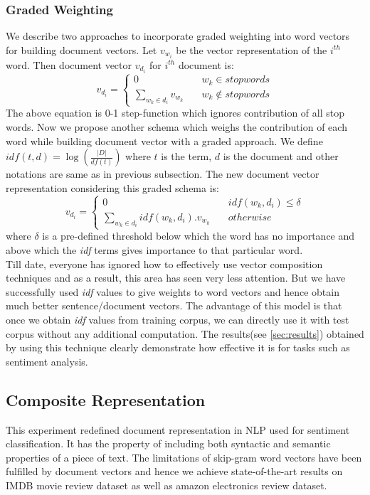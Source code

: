 \documentclass[11pt,a4paper]{article}
\begin{document}
\subsubsection{Graded Weighting}
\label{sec:graded_weighting}
We describe two approaches to incorporate graded weighting into word vectors for building document vectors. Let $v_{w_i}$ be the vector representation of the $i^{th}$ word. Then document vector $v_{d_i}$ for $i^{th}$ document is:
$$
v_{d_i} = \left\{
        \begin{array}{ll}
            0 & \quad w_k \in stopwords \\
            \sum\limits_{w_k \in d_i} v_{w_k} & \quad w_k \notin stopwords
        \end{array}
    \right.
$$
The above equation is 0-1 step-function which ignores contribution of all stop words. Now we propose another schema which weighs the contribution of each word while building document vector with a graded approach. We define $idf(t,d)=\log(\frac{|D|}{df(t)})$ where $t$ is the term, $d$ is the document and other notations are same as in previous subsection. The new document vector representation considering this graded schema is:
$$
v_{d_i} = \left\{
        \begin{array}{ll}
            0 & \quad idf(w_k,d_i) \leq \delta \\
            \sum\limits_{w_k \in d_i} idf(w_k,d_i).v_{w_k} & \quad otherwise
        \end{array}
    \right.
$$
where $\delta$ is a pre-defined threshold below which the word has no importance and above which the \emph{idf} terms gives importance to that particular word.\\
Till date, everyone has ignored how to effectively use vector composition techniques and as a result, this area has seen very less attention. But we have successfully used \emph{idf} values to give weights to word vectors and hence obtain much better sentence/document vectors. The advantage of this model is that once we obtain \emph{idf} values from training corpus, we can directly use it with test corpus without any additional computation. The results(see \ref{sec:results}) obtained by using this technique clearly demonstrate how effective it is for tasks such as sentiment analysis.

\subsection{Composite Representation}
This experiment redefined document representation in NLP used for sentiment classification. It has the property of including both syntactic and semantic properties of a piece of text. The limitations of skip-gram word vectors have been fulfilled by document vectors and hence we achieve state-of-the-art results on IMDB movie review dataset as well as amazon electronics review dataset.
\end{document}
